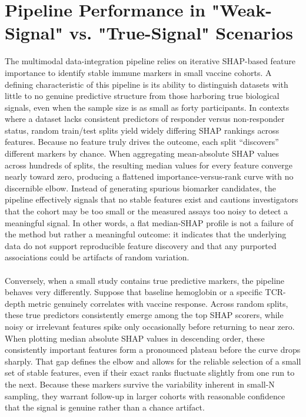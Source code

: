 \documentclass[12pt,a4paper]{report}
\begin{document}
\section{Pipeline Performance in "Weak-Signal" vs. "True-Signal" Scenarios}
\noindent
The multimodal data-integration pipeline relies on iterative SHAP-based feature importance to identify stable immune markers in small vaccine cohorts. A defining characteristic of this pipeline is its ability to distinguish datasets with little to no genuine predictive structure from those harboring true biological signals, even when the sample size is as small as forty participants. In contexts where a dataset lacks consistent predictors of responder versus non-responder status, random train/test splits yield widely differing SHAP rankings across features. Because no feature truly drives the outcome, each split “discovers” different markers by chance. When aggregating mean-absolute SHAP values across hundreds of splits, the resulting median values for every feature converge nearly toward zero, producing a flattened importance-versus-rank curve with no discernible elbow. Instead of generating spurious biomarker candidates, the pipeline effectively signals that no stable features exist and cautions investigators that the cohort may be too small or the measured assays too noisy to detect a meaningful signal. In other words, a flat median-SHAP profile is not a failure of the method but rather a meaningful outcome: it indicates that the underlying data do not support reproducible feature discovery and that any purported associations could be artifacts of random variation.\\
\\
Conversely, when a small study contains true predictive markers, the pipeline behaves very differently. Suppose that baseline hemoglobin or a specific TCR-depth metric genuinely correlates with vaccine response. Across random splits, these true predictors consistently emerge among the top SHAP scorers, while noisy or irrelevant features spike only occasionally before returning to near zero. When plotting median absolute SHAP values in descending order, these consistently important features form a pronounced plateau before the curve drops sharply. That gap defines the elbow and allows for the reliable selection of a small set of stable features, even if their exact ranks fluctuate slightly from one run to the next. Because these markers survive the variability inherent in small-N sampling, they warrant follow-up in larger cohorts with reasonable confidence that the signal is genuine rather than a chance artifact.\\
\end{document}
